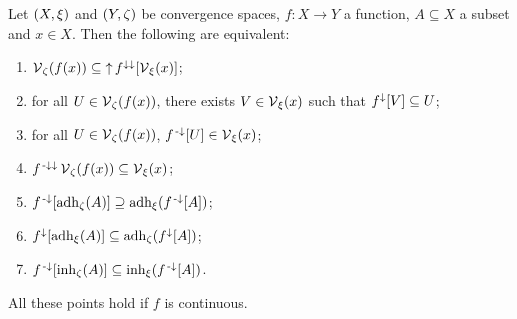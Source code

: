 \begin{proposition} \label{continuityVicinityFilter} \label{adherenceInherenceContinuity}
Let $\sSet{X,\xi}$ and $\sSet{Y,\zeta}$ be convergence spaces, $f: X\to Y$ a function, $A\subseteq X$ a subset and $x\in X$. Then the following are equivalent:
\begin{enumerate}
\item $\vicinity_\zeta(f(x)) \subseteq \upset f^{\imf\imf}[\vicinity_\xi(x)]$;
\item for all $U\in \vicinity_\zeta(f(x))$, there exists $V\in \vicinity_\xi(x)$ such that $f^\imf[V] \subseteq U$;
\item for all $U\in \vicinity_\zeta(f(x))$, $f^{\preimf}[U]\in \vicinity_\xi(x)$;
\item $f^{\preimf\imf}\vicinity_\zeta(f(x)) \subseteq \vicinity_\xi(x)$;
\item $f^\preimf[\adh_\zeta(A)] \supseteq \adh_\xi(f^\preimf[A])$;
\item $f^\imf[\adh_\xi(A)] \subseteq \adh_\zeta(f^\imf[A])$;
\item $f^\preimf[\inh_\zeta(A)] \subseteq \inh_\xi(f^\preimf[A])$.
\end{enumerate}
All these points hold if $f$ is continuous.
\end{proposition}
